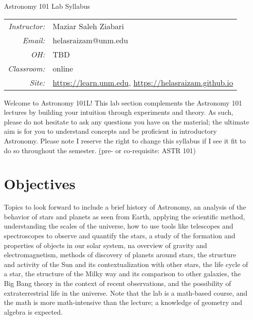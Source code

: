 \documentclass[12pt]{article}
\begin{document}

\newcommand{\TODO}[1]{}

\br\vspace{0cm}\begin{center}\Huge Astronomy 101 Lab Syllabus\end{center}\vspace{.5cm}

\noindent\begin{tabular}{>{\it}r l}
  Instructor:&Maziar Saleh Ziabari\\
  Email:&helasraizam@unm.edu\\
  OH:&TBD\\
  Classroom:&online\\
  Site:&\url{https://learn.unm.edu}, \url{https://helasraizam.github.io}
\end{tabular}
\vspace{.7cm}

\noindent Welcome to Astronomy 101L!  This lab section complements the Astronomy 101 lectures by building your intuition through experiments and theory.  As such, please do not hesitate to ask any questions you have on the material; the ultimate aim is for you to understand concepts and be proficient in introductory Astronomy.  Please note I reserve the right to change this syllabus if I see it fit to do so throughout the semester.  \b{(pre- or co-requisite: ASTR 101)}

\section*{Objectives}
Topics to look forward to include a brief history of Astronomy, an analysis of the behavior of stars and planets as seen from Earth, applying the scientific method, understanding the scales of the universe, how to use tools like telescopes and spectroscopes to observe and quantify the stars, a study of the formation and properties of objects in our solar system, na overview of gravity and electromagnetism, methods of discovery of planets around stars, the structure and activity of the Sun and its contextualization with other stars, the life cycle of a star, the structure of the Milky way and its comparison to other galaxies, the Big Bang theory in the context of recent observations, and the possibility of extraterrestrial life in the universe.  Note that the lab is a math-based course, and the math is more math-intensive than the lecture; a knowledge of geometry and algebra is expected.
\end{document}
